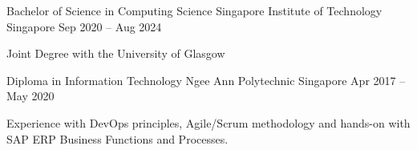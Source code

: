 

\begin{cventries}

  \cventry
  {Bachelor of Science in Computing Science} %
  {Singapore Institute of Technology} %
  {Singapore} %
  {Sep 2020 – Aug 2024} %
  {
    \begin{cvitems} %
      \item {Joint Degree with the University of Glasgow}\vspace{5mm}
    \end{cvitems}
  }

  \cventry
  {Diploma in Information Technology} %
  {Ngee Ann Polytechnic} %
  {Singapore} %
  {Apr 2017 – May 2020} %
  {
    \begin{cvitems} %
      \item {Experience with DevOps principles, Agile/Scrum methodology and hands-on with SAP ERP Business Functions and Processes. }\vspace{5mm}
    \end{cvitems}
  }

\end{cventries}